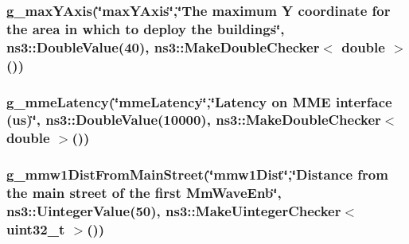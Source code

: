 \subsubsection[{\texorpdfstring{g\+\_\+max\+Y\+Axis}{g_maxYAxis}}]{ g\+\_\+max\+Y\+Axis(\char`\"{}max\+Y\+Axis\char`\"{},\char`\"{}The maximum Y coordinate for the area in which to deploy the buildings\char`\"{}, ns3\+::\+Double\+Value(40), {\bf ns3\+::\+Make\+Double\+Checker}$<$ double $>$())\hspace{0.3cm}{\ttfamily [static]}}\hypertarget{mc-twoenbs_8cc_ad14672f1ad4129263994be791ba0468b}{}\label{mc-twoenbs_8cc_ad14672f1ad4129263994be791ba0468b}
\subsubsection[{\texorpdfstring{g\+\_\+mme\+Latency}{g_mmeLatency}}]{ g\+\_\+mme\+Latency(\char`\"{}mme\+Latency\char`\"{},\char`\"{}Latency {\bf on} M\+ME interface (us)\char`\"{}, ns3\+::\+Double\+Value(10000), {\bf ns3\+::\+Make\+Double\+Checker}$<$ double $>$())\hspace{0.3cm}{\ttfamily [static]}}\hypertarget{mc-twoenbs_8cc_a69a2f99ec021e0807e2881cf7ec0fe53}{}\label{mc-twoenbs_8cc_a69a2f99ec021e0807e2881cf7ec0fe53}
\subsubsection[{\texorpdfstring{g\+\_\+mmw1\+Dist\+From\+Main\+Street}{g_mmw1DistFromMainStreet}}]{ g\+\_\+mmw1\+Dist\+From\+Main\+Street(\char`\"{}mmw1\+Dist\char`\"{},\char`\"{}Distance {\bf from} the {\bf main} street of the first Mm\+Wave\+Enb\char`\"{}, ns3\+::\+Uinteger\+Value(50), {\bf ns3\+::\+Make\+Uinteger\+Checker}$<$ uint32\+\_\+t $>$())\hspace{0.3cm}{\ttfamily [static]}}\hypertarget{mc-twoenbs_8cc_a69b5f118879ed3e1fdde4d1775c3a056}{}\label{mc-twoenbs_8cc_a69b5f118879ed3e1fdde4d1775c3a056}
